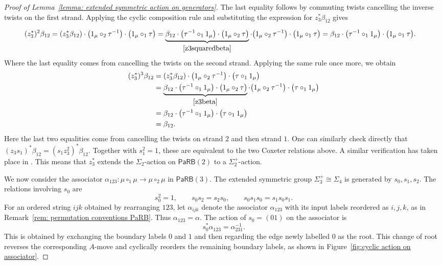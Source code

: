 \documentclass{amsart}
\newcommand{\PaRB}{\mathsf{PaRB}}
\newcommand{\twist}{\tau}
\theoremstyle{definition}
\numberwithin{equation}{section}
\begin{document}
\begin{proof}[Proof of Lemma~\ref{lemma: extended symmetric action on generators}]
The last equality follows by commuting twists cancelling the inverse twists on the first strand.
Applying the cyclic composition rule and substituting the expression
for $z_3^*\beta_{12}$ gives

\begin{equation}\label{z3squarebeta'}
\begin{aligned}
(z_3^*)^2\beta_{12}
&=(z_3^*\beta_{12})
  \cdot\bigl(1_\mu\circ_2\twist^{-1}\bigr)
  \cdot\bigl(1_\mu\circ_1\twist\bigr) =\underbrace{\beta_{12}\cdot\bigl(\twist^{-1}\circ_1 1_\mu\bigr)
  \cdot\bigl(1_\mu\circ_2\twist\bigr)}_{\eqref{z3squaredbeta}}
  \cdot\bigl(1_\mu\circ_2\twist^{-1}\bigr)
  \cdot\bigl(1_\mu\circ_1\twist\bigr) =\beta_{12}\cdot\bigl(\twist^{-1}\circ_1 1_\mu\bigr)
  \cdot\bigl(1_\mu\circ_1\twist\bigr).
\end{aligned}
\end{equation}
Where the last equality comes from cancelling the twists on the second strand. 
Applying the same rule once more, we obtain
\begin{equation}
\begin{aligned}
(z_3^*)^3\beta_{12}
&=(z_3^*\beta_{12})
  \cdot\bigl(1_\mu\circ_2\twist^{-1}\bigr)
  \cdot\bigl(\twist\circ_1 1_\mu\bigr)\\
&=\underbrace{\beta_{12}\cdot\bigl(\twist^{-1}\circ_1 1_\mu\bigr)
  \cdot\bigl(1_\mu\circ_2\twist\bigr)}_{\eqref{z3beta}}
  \cdot\bigl(1_\mu\circ_2\twist^{-1}\bigr)
  \cdot\bigl(\twist\circ_1 1_\mu\bigr)\\
&=\beta_{12}\cdot\bigl(\twist^{-1}\circ_1 1_\mu\bigr)
  \cdot\bigl(\twist\circ_1 1_\mu\bigr)\\
&=\beta_{12}.
\end{aligned}
\end{equation} Here the last two equalities come from cancelling the twists on strand $2$ and then strand $1$. One can similarly check directly that $(z_3s_1)^*\beta_{12}=(s_1z_3^2)^*\beta_{12}$. Together with
$s_1^2=1$, these are equivalent to the two Coxeter relations above.
A similar verification has taken place in \cite[Lemma 5.1]{cyclic_ribbon}. This means that $z_3^*$ extends the $\Sigma_2$-action on $\PaRB(2)$ to a $\Sigma_2^+$-action.
\medskip

We now consider the associator $\alpha_{123}\colon\mu\circ_1\mu\longrightarrow\mu\circ_2\mu$ in $\PaRB(3)$. The extended symmetric group $\Sigma_3^+\cong\Sigma_4$
is generated by $s_0,s_1,s_2$. The relations involving $s_0$ are
\[
s_0^2=1,\qquad s_0s_2=s_2s_0,\qquad s_0s_1s_0=s_1s_0s_1.
\]
For an ordered string $ijk$ obtained by rearranging $123$, let
$\alpha_{ijk}$ denote the associator $\alpha_{123}$ with its input
labels reordered as $i,j,k$, as in
Remark~\ref{rem: permutation conventions PaRB}. Thus
$\alpha_{123}=\alpha$. The action of $s_0=(01)$ on the associator is
\[
s_0^*\alpha_{123}=\alpha_{231}^{-1}.
\]
This is obtained by exchanging the boundary labels $0$ and $1$ and
then regarding the edge newly labelled $0$ as the root. This change
of root reverses the corresponding $A$-move and cyclically reorders
the remaining boundary labels, as shown in
Figure~\ref{fig:cyclic action on associator}.


\end{proof}
\end{document}
